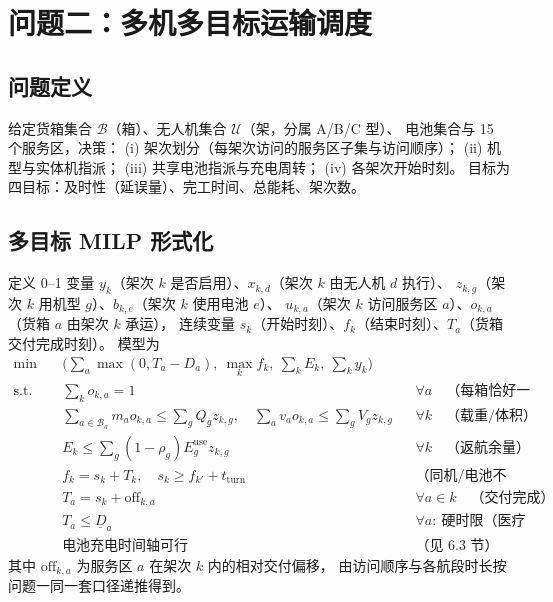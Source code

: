 \documentclass[12pt,a4paper,fontset=windows]{ctexart}
\begin{document}
\section{问题二：多机多目标运输调度}
\subsection{问题定义}
给定货箱集合 $\mathcal{B}$（\TotalBoxes 箱）、无人机集合 $\mathcal{U}$（\NumDrones 架，分属 A/B/C 型）、
电池集合与 15 个服务区，决策：
(i) 架次划分（每架次访问的服务区子集与访问顺序）；
(ii) 机型与实体机指派；
(iii) 共享电池指派与充电周转；
(iv) 各架次开始时刻。
目标为四目标：及时性（延误量）、完工时间、总能耗、架次数。

\subsection{多目标 MILP 形式化}
定义 0--1 变量 $y_k$（架次 $k$ 是否启用）、$x_{k,d}$（架次 $k$ 由无人机 $d$ 执行）、
$z_{k,g}$（架次 $k$ 用机型 $g$）、$b_{k,e}$（架次 $k$ 使用电池 $e$）、
$u_{k,a}$（架次 $k$ 访问服务区 $a$）、$o_{k,a}$（货箱 $a$ 由架次 $k$ 承运），
连续变量 $s_k$（开始时刻）、$f_k$（结束时刻）、$T_a$（货箱交付完成时刻）。
模型为
\begin{align}
\min\quad & \Big(\sum_{a}\max(0,T_a-D_a),\ \max_k f_k,\ \sum_k E_k,\ \sum_k y_k\Big)\\
\text{s.t.}\quad
& \sum_{k}o_{k,a}=1 && \forall a \quad\text{（每箱恰好一次）}\\
& \sum_{a\in\mathcal{B}_a} m_a o_{k,a}\le \sum_g Q_g z_{k,g},\quad
  \sum_{a}v_a o_{k,a}\le \sum_g V_g z_{k,g} && \forall k \quad\text{（载重/体积）}\\
& E_k\le\sum_g(1-\rho_g)E_g^{\mathrm{use}}z_{k,g} && \forall k \quad\text{（返航余量）}\\
& f_k=s_k+T_k,\quad s_k\ge f_{k'}+t_{\mathrm{turn}} && \text{（同机/电池不重叠）}\\
& T_a=s_k+\mathrm{off}_{k,a} && \forall a\in k \quad\text{（交付完成）}\\
& T_a\le \underline{D}_a && \forall a:\ \text{硬时限（医疗与首批）}\\
& \text{电池充电时间轴可行} && \text{（见 6.3 节）}
\end{align}
其中 $\mathrm{off}_{k,a}$ 为服务区 $a$ 在架次 $k$ 内的相对交付偏移，
由访问顺序与各航段时长按问题一同一套口径递推得到。
\end{document}
